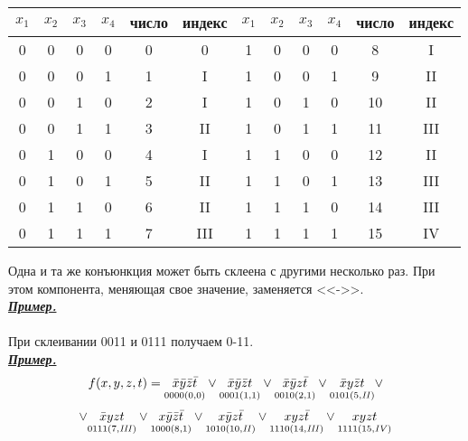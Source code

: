 \documentclass{article}
\begin{document}
	\begin{table}[ht]
		\begin{tabular}{|c|c|c|c|c|c|c|c|c|c|c|c|}
			\hline
			\multicolumn{1}{|l|}{$x_1$} &
			\multicolumn{1}{l|}{$x_2$} &
			\multicolumn{1}{l|}{$x_3$} &
			\multicolumn{1}{l|}{$x_4$} &
			\multicolumn{1}{l|}{число} &
			\multicolumn{1}{l|}{индекс} &
			\multicolumn{1}{l|}{$x_1$} &
			\multicolumn{1}{l|}{$x_2$} &
			\multicolumn{1}{l|}{$x_3$} &
			\multicolumn{1}{l|}{$x_4$} &
			\multicolumn{1}{l|}{число} &
			\multicolumn{1}{l|}{индекс} \\ \hline
			0 & 0 & 0 & 0 & 0 & 0   & 1 & 0 & 0 & 0 & 8  & I   \\ \hline
			0 & 0 & 0 & 1 & 1 & I   & 1 & 0 & 0 & 1 & 9  & II  \\ \hline
			0 & 0 & 1 & 0 & 2 & I   & 1 & 0 & 1 & 0 & 10 & II  \\ \hline
			0 & 0 & 1 & 1 & 3 & II  & 1 & 0 & 1 & 1 & 11 & III \\ \hline
			0 & 1 & 0 & 0 & 4 & I   & 1 & 1 & 0 & 0 & 12 & II  \\ \hline
			0 & 1 & 0 & 1 & 5 & II  & 1 & 1 & 0 & 1 & 13 & III \\ \hline
			0 & 1 & 1 & 0 & 6 & II  & 1 & 1 & 1 & 0 & 14 & III \\ \hline
			0 & 1 & 1 & 1 & 7 & III & 1 & 1 & 1 & 1 & 15 & IV  \\ \hline
		\end{tabular}
	\end{table}
	
	Одна и та же конъюнкция может быть склеена с другими несколько раз. При этом
	компонента, меняющая свое значение, заменяется <<->>.\\
	
	\newpage
	\textit{\textbf{\underline{Пример.}}}\\\\
	При склеивании 0011 и 0111 получаем 0-11.\\
	
	\textit{\textbf{\underline{Пример.}}}\\
	
	$$f(x, y, z, t) = \underset{0000 (0, 0)}{\bar{x} \bar{y} \bar{z} \bar{t}} \vee
	\underset{0001(1, 1)}{\bar{x} \bar{y} \bar{z} t} \vee \underset{0010(2, 1)}{\bar{x} \bar{y} z \bar{t}}
	\vee \underset{0101(5, \text{\textit{II}})}{\bar{x} y \bar{z} t} \vee$$
	$$\vee \underset{0111(7, \text{\textit{III}})}{\bar{x} yzt} \vee \underset{1000 (8, 1)}{x \bar{y} \bar{z} \bar{t}}
	\vee \underset{1010(10, \text{\textit{II}})}{x \bar{y} z \bar{t}} \vee \underset{1110(14, \text{\textit{III}})}{xyz \bar{t}}
	\vee \underset{1111(15, \text{\textit{IV}})}{xyzt}$$
\end{document}
